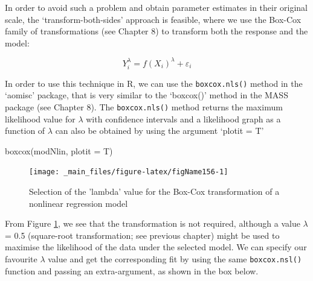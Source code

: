 \documentclass[a4paper,12pt,oneside]{book}
\newenvironment{Shaded}{\begin{snugshade}}{\end{snugshade}}
\newcommand{\SpecialCharTok}[1]{#1}
\newcommand{\DocumentationTok}[1]{#1}
\newcommand{\OtherTok}[1]{#1}
\newcommand{\FunctionTok}[1]{#1}
\newcommand{\AttributeTok}[1]{#1}
\newcommand{\NormalTok}[1]{#1}
\begin{document}
In order to avoid such a problem and obtain parameter estimates in their original scale, the `transform-both-sides' approach is feasible, where we use the Box-Cox family of transformations (see Chapter 8) to transform both the response and the model:

\[Y_i^\lambda  = f(X_i)^\lambda + \varepsilon_i\]

In order to use this technique in R, we can use the \texttt{boxcox.nls()} method in the `aomisc' package, that is very similar to the `boxcox()' method in the MASS package (see Chapter 8). The \texttt{boxcox.nls()} method returns the maximum likelihood value for \(\lambda\) with confidence intervals and a likelihood graph as a function of \(\lambda\) can also be obtained by using the argument `plotit = T'

\vspace{12pt}

\begin{Shaded}
\end{Shaded}

\begin{Shaded}
\begin{Highlighting}[]
\FunctionTok{boxcox}\NormalTok{(modNlin, }\AttributeTok{plotit =}\NormalTok{ T)}
\end{Highlighting}
\end{Shaded}

\begin{figure}

{\centering \texttt{[image: \_main\_files/figure-latex/figName156-1]} 

}

\caption{Selection of the 'lambda' value for the Box-Cox transformation of a nonlinear regression model}\label{fig:figName156}
\end{figure}

From Figure \ref{fig:figName156}, we see that the transformation is not required, although a value \(\lambda\) = 0.5 (square-root transformation; see previous chapter) might be used to maximise the likelihood of the data under the selected model. We can specify our favourite \(\lambda\) value and get the corresponding fit by using the same \texttt{boxcox.nsl()} function and passing an extra-argument, as shown in the box below.
\end{document}
